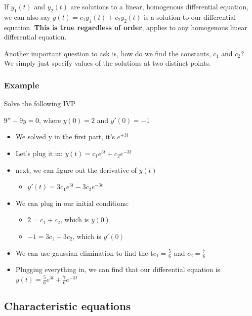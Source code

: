 \documentclass{article}
\begin{document}
If $y_1 (t)$ and $y_2 (t)$ are solutions to a linear, homogenous differential equation, we can also say $y(t) = c_1 y_1 (t) + c_2 y_2 (t)$ is a solution to our differential equation. \textbf{This is true regardless of order}, applies to any homogenous linear differential equation.

Another important question to ask is, how do we find the constants, $c_1$ and $c_2$? We simply just specify values of the solutions at two distinct points.

\subsubsection{Example}

Solve the following IVP

\begin{center}
    $9'' - 9y = 0$, where $y(0) = 2$ and $y'(0) = -1$
\end{center}

\begin{itemize}
    \item We solved y in the first part, it's $e^{\pm 3t}$
    \item Let's plug it in: $y(t) = c_1 e^{3t} + c_2 e^{-3t}$
    \item next, we can figure out the derivative of $y(t)$
    \begin{itemize}
        \item $y'(t) = 3c_1 e^{3t} - 3c_2 e^{-3t}$
    \end{itemize}
    \item We can plug in our initial conditions:
    \begin{itemize}
        \item $2 = c_1 + c_2$, which is $y(0)$
        \item $-1 = 3c_1 - 3c_2$, which is $y'(0)$
    \end{itemize}
    \item We can use gaussian elimination to find the t$c_1 = \frac{5}{6}$ and $c_2 = \frac{7}{6}$
    \item Plugging everything in, we can find that our differential equation is $y(t) = \frac{5}{6} e^{3t} + \frac{7}{6} e^{-3t}$
\end{itemize}

\subsection{Characteristic equations}
\end{document}
